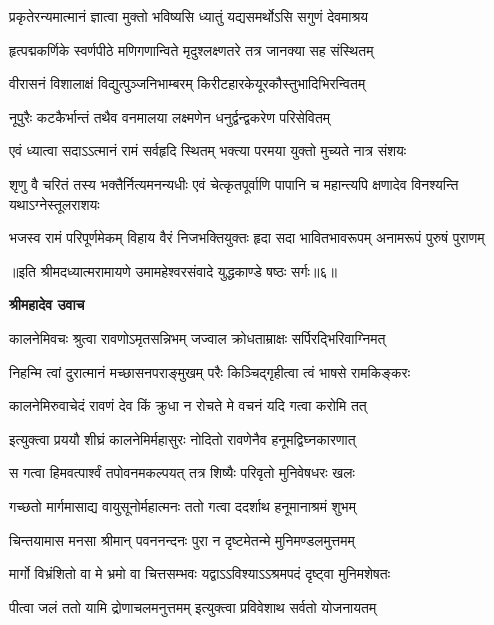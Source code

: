\twolineshloka
{प्रकृतेरन्यमात्मानं ज्ञात्वा मुक्तो भविष्यसि}
{ध्यातुं यद्यसमर्थोऽसि सगुणं देवमाश्रय} %

\twolineshloka
{हृत्पद्मकर्णिके स्वर्णपीठे मणिगणान्विते}
{मृदुश्लक्ष्णतरे तत्र जानक्या सह संस्थितम्} %

\twolineshloka
{वीरासनं विशालाक्षं विद्युत्पुञ्जनिभाम्बरम्}
{किरीटहारकेयूरकौस्तुभादिभिरन्वितम्} %

\twolineshloka
{नूपुरैः कटकैर्भान्तं तथैव वनमालया}
{लक्ष्मणेन धनुर्द्वन्द्वकरेण परिसेवितम्} %

\twolineshloka
{एवं ध्यात्वा सदाऽऽत्मानं रामं सर्वहृदि स्थितम्}
{भक्त्या परमया युक्तो मुच्यते नात्र संशयः} %

\threelineshloka
{शृणु वै चरितं तस्य भक्तैर्नित्यमनन्यधीः}
{एवं चेत्कृतपूर्वाणि पापानि च महान्त्यपि}
{क्षणादेव विनश्यन्ति यथाऽग्नेस्तूलराशयः} %

\fourlineindentedshloka
{भजस्व रामं परिपूर्णमेकम्}
{विहाय वैरं निजभक्तियुक्तः}
{हृदा सदा भावितभावरूपम्}
{अनामरूपं पुरुषं पुराणम्} %

{॥इति श्रीमदध्यात्मरामायणे उमामहेश्वरसंवादे युद्धकाण्डे षष्ठः
सर्गः॥६॥
}




\textbf{श्रीमहादेव उवाच}

\twolineshloka
{कालनेमिवचः श्रुत्वा रावणोऽमृतसन्निभम्}
{जज्वाल क्रोधताम्राक्षः सर्पिरद्भिरिवाग्निमत्} %

\twolineshloka
{निहन्मि त्वां दुरात्मानं मच्छासनपराङ्मुखम्}
{परैः किञ्चिद्गृहीत्वा त्वं भाषसे रामकिङ्करः} %

\twolineshloka
{कालनेमिरुवाचेदं रावणं देव किं क्रुधा}
{न रोचते मे वचनं यदि गत्वा करोमि तत्} %

\twolineshloka
{इत्युक्त्वा प्रययौ शीघ्रं कालनेमिर्महासुरः}
{नोदितो रावणेनैव हनूमद्विघ्नकारणात्} %

\twolineshloka
{स गत्वा हिमवत्पार्श्वं तपोवनमकल्पयत्}
{तत्र शिष्यैः परिवृतो मुनिवेषधरः खलः} %

\twolineshloka
{गच्छतो मार्गमासाद्य वायुसूनोर्महात्मनः}
{ततो गत्वा ददर्शाथ हनूमानाश्रमं शुभम्} %

\twolineshloka
{चिन्तयामास मनसा श्रीमान् पवननन्दनः}
{पुरा न दृष्टमेतन्मे मुनिमण्डलमुत्तमम्} %

\twolineshloka
{मार्गो विभ्रंशितो वा मे भ्रमो वा चित्तसम्भवः}
{यद्वाऽऽविश्याऽऽश्रमपदं दृष्ट्वा मुनिमशेषतः} %

\twolineshloka
{पीत्वा जलं ततो यामि द्रोणाचलमनुत्तमम्}
{इत्युक्त्वा प्रविवेशाथ सर्वतो योजनायतम्} %

